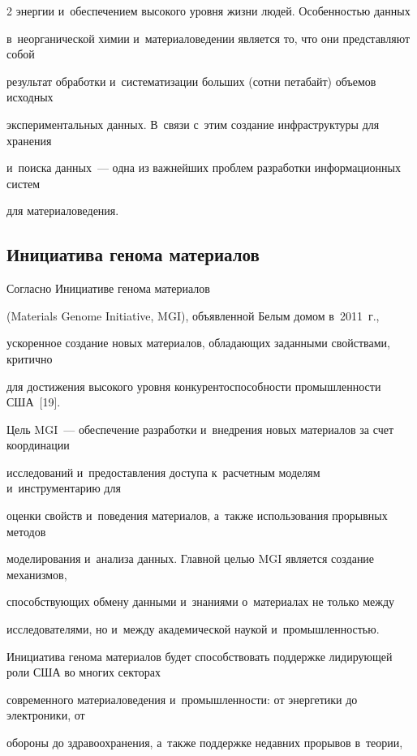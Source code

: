 \begin{multicols}{2}
энергии и~обеспечением высокого уровня жизни людей. Особенностью данных 


в~неорганической химии и~материаловедении является то, что они представляют собой 


результат обработки и~систематизации больших (сотни петабайт) объемов исходных 


экспериментальных данных. В~связи с~этим создание инфраструктуры для хранения 


и~поиска данных~--- одна из важнейших проблем разработки информационных сис\-тем 


для материаловедения. 





\subsection{Инициатива генома материалов}





  Согласно Инициативе генома материалов 


  (Materials Genome Initiative, MGI), объявленной Белым домом в~2011~г., 


ускоренное создание новых материалов, обладающих заданными свойствами, критично 


для достижения высокого уровня конкурентоспособности промышленности США~[19]. 


Цель MGI~--- обеспечение разработки и~внедрения новых материалов за счет координации 


исследований и~предоставления доступа к~расчетным моделям и~инструментарию для 


оценки свойств и~поведения материалов, а~также использования прорывных методов 


моделирования и~анализа данных. Главной целью MGI является создание механизмов, 


способствующих обмену данными и~знаниями о~материалах не только между 


исследователями, но и~между академической наукой и~промышленностью.


  


  Инициатива генома материалов будет способствовать поддержке лидиру\-ющей роли США во многих секторах 


современного материаловедения и~промышленности: от энергетики до электроники, от 


обороны до здравоохранения, а~так\-же поддержке недавних прорывов в~тео\-рии, 



\end{multicols}
